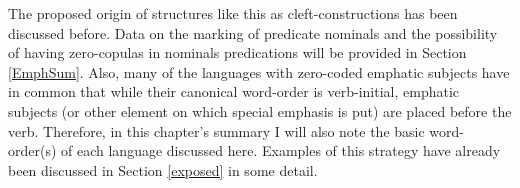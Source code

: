 The proposed origin of structures like this as cleft-constructions has been discussed before. 
Data on the marking of predicate nominals and the possibility of having zero-copulas in nominals predications will be provided in Section \ref{EmphSum}.
Also, many of the languages with zero-coded emphatic subjects have in common that while their canonical word-order is verb-initial, emphatic subjects (or other element on which special emphasis is put) are placed before the verb. 
Therefore, in this chapter's summary I will also note the basic word-order(s) of each language discussed here. 
Examples of this strategy have already been discussed in Section \ref{exposed} in some detail.

